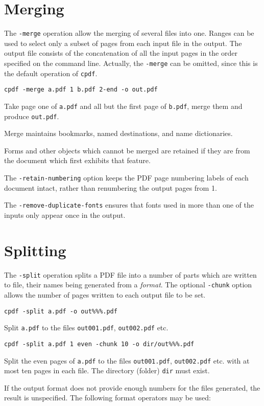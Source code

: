 \documentclass{book}
\newcommand{\cpdf}{\texttt{cpdf}}
\begin{document}
  \vspace{12mm}
  \section{Merging}
  The \texttt{-merge} operation allow the merging of several files into one.
Ranges can be used to select only a subset of pages from each
input file in the output. The output file consists of the concatenation of all
the input pages in the order specified on the command line. Actually, the
\texttt{-merge} can be omitted, since this is the default operation of \cpdf.

  \begin{framed}\small
    \verb!cpdf -merge a.pdf 1 b.pdf 2-end -o out.pdf!

    \vspace{2.5mm}
    \noindent Take page one of \texttt{a.pdf} and all but the first page of
\texttt{b.pdf}, merge them and produce \texttt{out.pdf}.
  \end{framed}

\noindent Merge maintains bookmarks, named destinations, and name dictionaries.

Forms and other objects which cannot be merged are retained if they are from
the document which first exhibits that feature.

The \texttt{-retain-numbering} option keeps the PDF page numbering labels of
each document intact, rather than renumbering the output pages from 1.

The \texttt{-remove-duplicate-fonts} ensures that fonts used in more than one
of the inputs only appear once in the output.

  \section{Splitting}
   The \texttt{-split} operation splits a PDF file into a number of parts which
are written to file, their names being generated from a \emph{format}. The
optional \texttt{-chunk} option allows the number of pages written to each
output file to be set. 
  \begin{framed}\small
    \verb!cpdf -split a.pdf -o out%%%.pdf!

    \vspace{2.5mm}
    \noindent Split \texttt{a.pdf} to the files \texttt{out001.pdf}, \texttt{out002.pdf} etc.

    \vspace{2.5mm}
    \verb!cpdf -split a.pdf 1 even -chunk 10 -o dir/out%%%.pdf!

    \vspace{2.5mm}
    \noindent Split the even pages of \texttt{a.pdf} to the files
\texttt{out001.pdf}, \texttt{out002.pdf} etc. with at most ten pages in each
file. The directory (folder) \texttt{dir} must exist.
  \end{framed}
\noindent If the output format does not provide enough numbers for the files generated,
the result is unspecified. The following format operators may be used:
\end{document}
